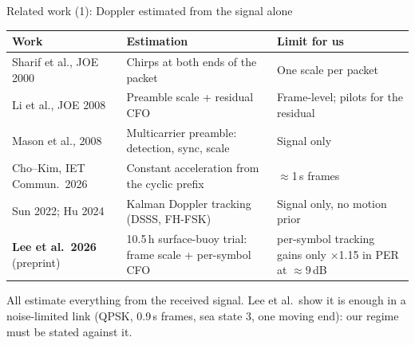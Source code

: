 \documentclass[aspectratio=169,11pt]{beamer}
\begin{document}
\begin{frame}{Related work (1): Doppler estimated from the signal alone}
\scriptsize\setlength{\tabcolsep}{3pt}\renewcommand{\arraystretch}{0.95}
\begin{tabular}{@{}L{0.30\textwidth}L{0.36\textwidth}L{0.30\textwidth}@{}}
\toprule
\textbf{Work} & \textbf{Estimation} & \textbf{Limit for us}\\
\midrule
Sharif et al., JOE 2000 & Chirps at both ends of the packet & One scale per packet\\
Li et al., JOE 2008 & Preamble scale + residual CFO & Frame-level; pilots for the residual\\
Mason et al., 2008 & Multicarrier preamble: detection, sync, scale & Signal only\\
Cho--Kim, IET Commun.\ 2026 & Constant acceleration from the cyclic prefix & $\approx$1\,s frames\\
Sun 2022; Hu 2024 & Kalman Doppler tracking (DSSS, FH-FSK) & Signal only, no motion prior\\
\textbf{Lee et al.\ 2026} (preprint) & 10.5\,h surface-buoy trial: frame scale + per-symbol CFO & per-symbol tracking gains only $\times$1.15 in PER at $\approx$9\,dB\\
\bottomrule
\end{tabular}

\vspace{1mm}
\footnotesize All estimate everything from the received signal. Lee et al.\ show it is enough in a noise-limited link (QPSK, 0.9\,s frames, sea state 3, one moving end): our regime must be stated against it.
\end{frame}
\end{document}

